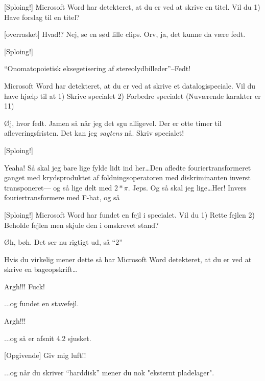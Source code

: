 \documentclass[danish,11pt]{article}
\begin{document}
\begin{sketch}
 [Sploing!] Microsoft Word har detekteret, at du er ved
at skrive en titel. Vil du 1) Have forslag til en titel?

[overrasket] Hvad!?  Nej, se en sød lille
clips. Orv, ja, det kunne da være fedt. 

 [Sploing!]

 ``Onomatopoietisk eksegetisering af
stereolydbilleder''--Fedt! 

 Microsoft Word har detekteret, at du er ved at skrive et
datalogispeciale. Vil du have hjælp til at 1) Skrive specialet 2)
Forbedre specialet (Nuværende karakter er 11)

 Øj, hvor fedt. Jamen så når jeg det sgu
alligevel.  Der er otte timer til
afleveringsfristen.  Det kan jeg {\em sagtens}
nå.  Skriv specialet!


 [Sploing!]

 Yeaha!  Så skal jeg bare lige fylde
lidt ind her\ldots Den afledte fouriertransformeret ganget med
krydsproduktet af foldningsoperatoren med diskriminanten inverst
transponeret--- og så lige delt med $2*\pi$. Jeps. Og så skal jeg
lige\ldots Her! Invers fouriertransformere med F-hat, og så

 [Sploing!] Microsoft Word har fundet en fejl i specialet. Vil du 1)
Rette fejlen 2) Beholde fejlen men skjule den i omskrevet stand?

 Øh, bøh. Det ser nu rigtigt ud, så ``2''

 Hvis du virkelig mener dette så har Microsoft Word
detekteret, at du er ved at skrive en bageopskrift\ldots

 Argh!!!  Fuck!

 ...og fundet en stavefejl.

 Argh!!! 

 ...og så er afsnit 4.2 sjusket.

 [Opgivende] Giv mig luft!!

 ...og når du skriver ``harddisk'' mener du nok "eksternt
pladelager".


\end{sketch}
\end{document}
